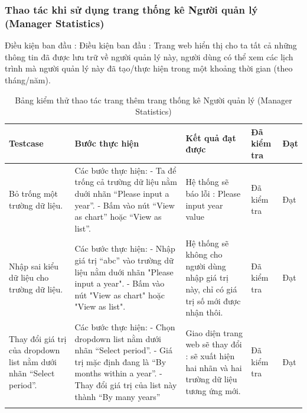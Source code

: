 \documentclass[a4paper]{article}
\begin{document}
\subsubsection*{Thao tác khi sử dụng trang thống kê Người quản lý (Manager Statistics) }
Điều kiện ban đầu : Điều kiện ban đầu : Trang web hiển thị cho ta tất cả những thông tin đã được lưu trữ về người quản lý này, người dùng có thể xem các lịch trình mà người quản lý này đã tạo/thực hiện trong một khoảng thời gian (theo tháng/năm).  \newline
\begin{longtable}{ | p{} |p{} | p{}  | p{}  | p{}  | } 
\hline
\textbf{Testcase}& \textbf{Bước thực hiện}& \textbf{Kết quả đạt được} & \textbf{Đã kiểm tra}& \textbf{Đạt} \\ 
\hline
\hline
Bỏ trống một trường dữ liệu. &
Các bước thực hiện: \newline
- Ta để trống cả trường dữ liệu nằm duới nhãn “Please input a year”. \newline
- Bấm vào nút “View as chart” hoặc “View as list”.
&
Hệ thống sẽ báo lỗi : Please input year value
&
Đã kiểm tra &
Đạt \\

\hline
Nhập sai kiểu dữ liệu cho trường dữ liệu. &
Các bước thực hiện: \newline
- Nhập giá trị “abc” vào trường dữ liệu nằm duới nhãn "Please input a year".  \newline
- Bấm vào nút "View as chart" hoặc "View as list".
&
Hệ thống sẽ không cho người dùng nhập giá trị này, chỉ có giá trị số mới được nhận thôi.
&
Đã kiểm tra &
Đạt \\

\hline
Thay đổi giá trị của dropdown list nằm dưới nhãn “Select period”. &
Các bước thực hiện: \newline
- Chọn dropdown list nằm dưới nhãn “Select period”.  \newline
- Giá trị mặc định đang là “By months within a year”. \newline
- Thay đổi giá trị của list này thành “By many years”  
&
Giao diện trang web sẽ thay đổi : sẽ xuất hiện hai nhãn và hai trường dữ liệu tương ứng mới.
&
Đã kiểm tra &
Đạt \\

\hline
\caption{Bảng kiểm thử thao tác trang thêm trang thống kê Người quản lý (Manager Statistics)}
\end{longtable}
\end{document}

